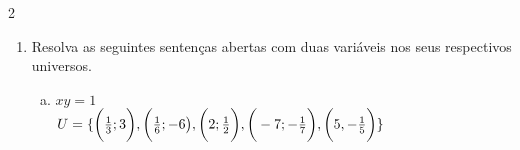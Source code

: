 \documentclass[a4paper,14pt]{article}
\begin{document}
\begin{multicols}{2}
\begin{enumerate}
\begin{enumerate}[a)]
        	    $
        	    \begin{cases}
        	    	x^2 + 2y = 7 \\
        	    	~~~~ou~~~~~~~~~~~ \\
        	    	3x - 2y = 5 \\
        	    \end{cases}	
        	    $\\\\\\\\\\\\\\\\\\\\\\\\\\\\\\\\\\\\\\\\\\\\\\\\\\\\\\\\\\\\\\\\
    	    \end{enumerate}
            \item Resolva as seguintes sentenças abertas com duas variáveis nos seus respectivos universos.
            \begin{enumerate}[a)]
                \item $xy = 1$ \\
                $U = \{
                \bigg(\frac{1}{3};3\bigg),
                \bigg(\frac{1}{6};-6\big),
                \bigg(2;\frac{1}{2}\bigg),\\
                \bigg(-7;-\frac{1}{7}\bigg),
                \bigg(5,-\frac{1}{5}\bigg)
                \}$\\\\\\\\\\\\\\\\\\\\\\\\\\\\

\end{enumerate}
\end{enumerate}
\end{multicols}
\end{document}
